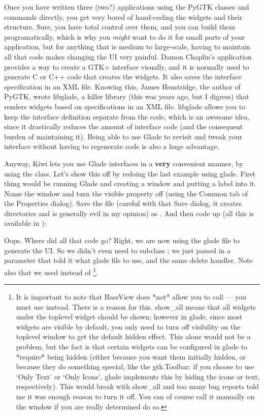\documentclass[a4paper]{howto}
\begin{document}
Once you have written three (two?) applications using the PyGTK classes
and commands directly, you get very bored of hand-coding the widgets and
their structure. Sure, you have total control over them, and you can
build them programatically, which is why you {\it might} want to do it
for small parts of your application, but for anything that is medium to
large-scale, having to maintain all that code makes changing the UI very
painful. Damon Chaplin's application
 provides a way to create a
GTK+ interface visually, and it is normally used to generate C or C++
code that creates the widgets. It also saves the interface specification
in an XML file. Knowing this, James Henstridge, the author of PyGTK,
wrote libglade, a killer library (this was years ago, but I digress)
that renders widgets based on specifications in an XML file. libglade
allows you to keep the interface definition separate from the code,
which is an awesome idea, since it drastically reduces the amount of
interface code (and the consequent burden of maintaining it). Being able
to use Glade to revisit and tweak your interface without having to
regenerate code is also a huge advantage.

Anyway, Kiwi lets you use Glade interfaces in a {\bf very} convenient
manner, by using the  class. Let's show this off by
redoing the last example using glade. First thing would be running Glade
and creating a window and putting a label into it. Name the window
 and turn the visible property off (using the Common tab of
the Properties dialog). Save the file (careful with that Save dialog, it
creates directories and is generally evil in my opinion) as
. And then code up  (all this is
available in ):



Oops. Where did all that code go? Right, we are now using the glade file
to generate the UI. So we didn't even need to subclass
; we just passed in a parameter that told it what glade
file to use, and the same delete handler. Note also that we used
 instead of
\footnote{ It is important to note that
BaseView does *not* allow you to call  ---
you must use  instead.  There is a reason for
this. show\_all means that all widgets under the toplevel widget should
be shown; however in glade, since most widgets are visible by default,
you only need to turn off visibility on the toplevel window to get the
default hidden effect. This alone would not be a problem, but the fact
is that certain widgets can be configured in glade to *require* being
hidden (either because you want them initially hidden, or because they
do something special, like the gtk.Toolbar: if you choose to use `Only
Text' or `Only Icons', glade implements this by hiding the icons or
text, respectively). This would break with show\_all and too many bug
reports told me it was enough reason to turn it off. You can of course
call it manually on the window if you are really determined do so.}.
\end{document}
